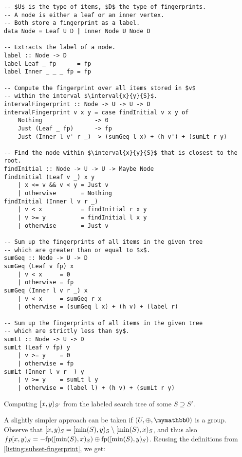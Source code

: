 \begin{listing}[ht]
\begin{verbatim}
-- $U$ is the type of items, $D$ the type of fingerprints.
-- A node is either a leaf or an inner vertex.
-- Both store a fingerprint as a label.
data Node = Leaf U D | Inner Node U Node D

-- Extracts the label of a node.
label :: Node -> D
label Leaf _ fp      = fp
label Inner _ _ _ fp = fp

-- Compute the fingerprint over all items stored in $v$
-- within the interval $\interval{x}{y}{S}$.
intervalFingerprint :: Node -> U -> U -> D
intervalFingerprint v x y = case findInitial v x y of
    Nothing               -> 0
    Just (Leaf _ fp)      -> fp
    Just (Inner l v' r _) -> (sumGeq l x) + (h v') + (sumLt r y)
                                           
-- Find the node within $\interval{x}{y}{S}$ that is closest to the root.
findInitial :: Node -> U -> U -> Maybe Node
findInitial (Leaf v _) x y
    | x <= v && v < y = Just v
    | otherwise       = Nothing
findInitial (Inner l v r _)
    | v < x           = findInitial r x y
    | v >= y          = findInitial l x y
    | otherwise       = Just v

-- Sum up the fingerprints of all items in the given tree
-- which are greater than or equal to $x$.
sumGeq :: Node -> U -> D
sumGeq (Leaf v fp) x
    | v < x     = 0
    | otherwise = fp
sumGeq (Inner l v r _) x
    | v < x     = sumGeq r x
    | otherwise = (sumGeq l x) + (h v) + (label r)

-- Sum up the fingerprints of all items in the given tree
-- which are strictly less than $y$.
sumLt :: Node -> U -> D
sumLt (Leaf v fp) y
    | v >= y    = 0
    | otherwise = fp
sumLt (Inner l v r _) y
    | v >= y    = sumLt l y
    | otherwise = (label l) + (h v) + (sumLt r y)
\end{verbatim}
\caption{Computing $\interval{x}{y}{S'}$ from the labeled search tree of some $S \supseteq S'$.}
\label{listing:subset-fingerprint}
\end{listing}

A slightly simpler approach can be taken if $(U, \groupaddsym, \neutraladd)$ is a group. Observe that $[{x},{y})_{S} = [{\min(S)},{y})_{S} \setminus [{\min(S)},{x})_{S}$, and thus also $fp{[{x},{y})_{S}} = {-{\operatorname{fp}([{\min(S)},{x})_{S})}} \oplus {\operatorname{fp}([{\min(S)},{y})_{S})}$. Reusing the definitions from \cref{listing:subset-fingerprint}, we get:

